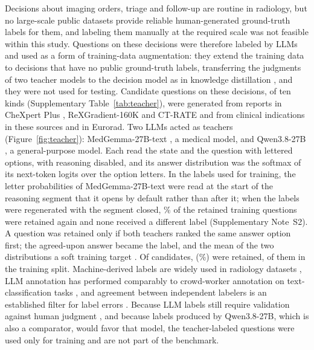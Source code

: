 \documentclass[11pt]{article}
\begin{document}
Decisions about imaging orders, triage and follow-up are routine in radiology, but no large-scale public datasets provide reliable human-generated ground-truth labels for them, and labeling them manually at the required scale was not feasible within this study. Questions on these decisions were therefore labeled by LLMs and used as a form of training-data augmentation: they extend the training data to decisions that have no public ground-truth labels, transferring the judgments of two teacher models to the decision model as in knowledge distillation \citep{hinton2015distilling}, and they were not used for testing. Candidate questions on these decisions, of ten kinds (Supplementary Table~\ref{tab:teacher}), were generated from reports in CheXpert Plus \citep{chambon2024chexpertplus}, ReXGradient-160K \citep{zhang2025rexgradient} and CT-RATE and from clinical indications in these sources and in Eurorad. Two LLMs acted as teachers (Figure~\ref{fig:teacher}): MedGemma-27B-text \citep{sellergren2025medgemma}, a medical model, and Qwen3.8-27B \citep{qwen38}, a general-purpose model. Each read the state and the question with lettered options, with reasoning disabled, and its answer distribution was the softmax of its next-token logits over the option letters. In the labels used for training, the letter probabilities of MedGemma-27B-text were read at the start of the reasoning segment that it opens by default rather than after it; when the labels were regenerated with the segment closed, \% of the retained training questions were retained again and none received a different label (Supplementary Note~S2). A question was retained only if both teachers ranked the same answer option first; the agreed-upon answer became the label, and the mean of the two distributions a soft training target \citep{hinton2015distilling}. Of  candidates,  (\%) were retained,  of them in the training split. Machine-derived labels are widely used in radiology datasets \citep{irvin2019chexpert,hamamci2026ctrate}, LLM annotation has performed comparably to crowd-worker annotation on text-classification tasks \citep{gilardi2023chatgpt}, and agreement between independent labelers is an established filter for label errors \citep{brodley1999mislabeled}. Because LLM labels still require validation against human judgment \citep{pangakis2023validation}, and because labels produced by Qwen3.8-27B, which is also a comparator, would favor that model, the teacher-labeled questions were used only for training and are not part of the benchmark.
\end{document}
